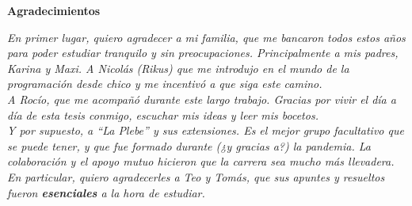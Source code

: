 \thispagestyle{plain}
\begin{center}
\large
\textbf{Agradecimientos}
\end{center}

\textit{
En primer lugar, quiero agradecer a mi familia, que me bancaron todos estos años para poder estudiar tranquilo y sin preocupaciones. Principalmente a mis padres, \mbox{Karina} y \mbox{Maxi}. A Nicolás (Rikus) que me introdujo en el mundo de la programación desde chico y me incentivó a que siga este camino.
}\\

\textit{
A Rocío, que me acompañó durante este largo trabajo. Gracias por vivir el día a día de esta tesis conmigo,  escuchar mis ideas y leer mis bocetos.
} \\

\textit{
Y por supuesto, a \enquote{La Plebe} y sus extensiones. Es el mejor grupo facultativo que se puede tener, y que fue formado durante (¿y gracias a?) la pandemia. La colaboración y el apoyo mutuo hicieron que la carrera sea mucho más llevadera. En particular, quiero agradecerles a Teo y Tomás, que sus apuntes y resueltos fueron \textbf{esenciales} a la hora de estudiar.
}

\clearpage
